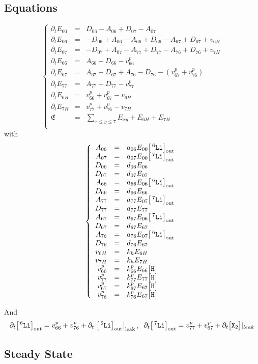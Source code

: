 \documentclass[aps,onecolumn,11pt]{revtex4}
\newcommand{\mychem}[1]{\mathtt{#1}}
\newcommand{\myconc}[1]{\big[#1\big]}
\newcommand{\spx}{\mychem{X}}
\newcommand{\spLi}[1]{{\!~^{#1}\mychem{Li}}}
\newcommand{\Li}[1]{\myconc{\spLi{#1}}}
\newcommand{\spproton}{\mychem{H}}
\newcommand{\proton}{\myconc{\spproton}}
\newcommand{\myleak}[1]{\left.{#1}\right\vert_{\mathrm{leak}}}
\newcommand{\myout}[1]{{#1}_{\tiny\mathrm{out}}}
\newcommand{\LiOut}[1]{\myout{\Li{#1}}}
\begin{document}
\subsection{Equations}
\begin{equation}
\left\lbrace
\begin{array}{rcl}
\partial_t E_{00} & = & D_{06}-A_{06} + D_{07}-A_{07}\\
\partial_t E_{06} & = & -D_{06}+A_{06} - A_{66} + D_{66} - A_{67} + D_{67} + v_{6H}\\
\partial_t E_{07} & = & -D_{07}+A_{07} - A_{77} + D_{77} - A_{76} + D_{76} + v_{7H}\\
\partial_t E_{66} & = & A_{66}-D_{66} -v^p_{66}\\
\partial_t E_{67} & = & A_{67}-D_{67} + A_{76}-D_{76} - (v^p_{67}+v^p_{76})\\
\partial_t E_{77} & = & A_{77}-D_{77} - v^p_{77}\\
\partial_t E_{6H} & = & v^p_{66}+v^p_{67} - v_{6H}\\
\partial_t E_{7H} & = & v^p_{77}+v^p_{76} - v_{7H}\\
\mathfrak{E}      & = & {\displaystyle \sum_{x\leq y\leq 7} E_{xy}}+E_{6H}+E_{7H}\\
\end{array}
\right.
\end{equation}
with
\begin{equation}
\left\lbrace
\begin{array}{rcl}
A_{06}   & = & a_{06} E_{00} \LiOut{6}\\
A_{07}   & = & a_{07} E_{00} \LiOut{7}\\
D_{06}   & = & d_{06} E_{06}\\
D_{07}   & = & d_{07} E_{07}\\
A_{66}   & = & a_{66} E_{06} \LiOut{6} \\
D_{66}   & = & d_{66} E_{66}\\
A_{77}   & = & a_{77} E_{07} \LiOut{7} \\
D_{77}   & = & d_{77} E_{77}\\
A_{67}   & = & a_{67} E_{06} \LiOut{7}\\
D_{67}   & = & d_{67} E_{67}\\
A_{76}   & = & a_{76} E_{07} \LiOut{6}\\
D_{76}   & = & d_{76} E_{67}\\
v_{6H}   & = & k_h E_{6H}\\
v_{7H}   & = & k_h E_{7H}\\
v^p_{66} & = & k^p_{66} E_{66} \proton \\
v^p_{77} & = & k^p_{77} E_{77} \proton \\
v^p_{67} & = & k^p_{67} E_{67} \proton \\
v^p_{76} & = & k^p_{76} E_{67} \proton \\
\end{array}
\right.
\end{equation}

And
\begin{equation}
	\partial_t \LiOut{6} = v^p_{66}+v^p_{76} + \partial_t \myleak{\LiOut{6}},\;\;
	\partial_t \LiOut{7} = v^p_{77}+v^p_{67} + \partial_t \myconc{\spx_2}\vert_{leak}
\end{equation}

\subsection{Steady State}
\end{document}
